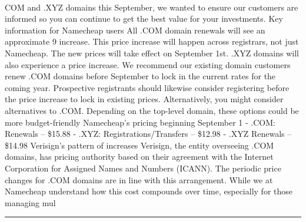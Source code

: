 \documentclass[10pt,a4paper]{article}
\begin{document}
\begin{multicols*}{2}
\paragraph{}
COM and .XYZ domains this September, we wanted to ensure our customers are informed so you can continue to get the best value for your investments.
Key information for Namecheap users
All .COM domain renewals will see an approximate 9 increase. This price increase will happen across registrars, not just Namecheap. The new prices will take effect on September 1st. .XYZ domains will also experience a price increase.
We recommend our existing domain customers renew .COM domains before September to lock in the current rates for the coming year. Prospective registrants should likewise consider registering before the price increase to lock in existing prices.
Alternatively, you might consider alternatives to .COM. Depending on the top-level domain, these options could be more budget-friendly
Namecheap’s pricing beginning September 1
- .COM: Renewals – \$15.88
- .XYZ: Registrations/Transfers – \$12.98
- .XYZ Renewals – \$14.98
Verisign’s pattern of increases
Verisign, the entity overseeing .COM domains, has pricing authority based on their agreement with the Internet Corporation for Assigned Names and Numbers (ICANN). The periodic price changes for .COM domains are in line with this arrangement.
While we at Namecheap understand how this cost compounds over time, especially for those managing mul
\par\noindent\textcolor{red}{\rule{\linewidth}{0.2mm}}
\vfill
\null
\noindent\begin{minipage}{\linewidth}

\end{minipage}
\end{multicols*}
\end{document}
